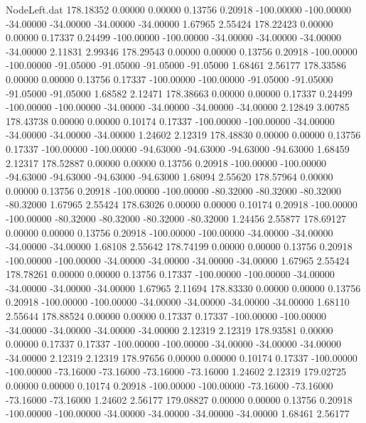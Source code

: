 \begin{filecontents}{NodeLeft.dat}
 178.18352    0.00000    0.00000     0.13756    0.20918 -100.00000 -100.00000  -34.00000  -34.00000  -34.00000  -34.00000    1.67965    2.55424
 178.22423    0.00000    0.00000     0.17337    0.24499 -100.00000 -100.00000  -34.00000  -34.00000  -34.00000  -34.00000    2.11831    2.99346
 178.29543    0.00000    0.00000     0.13756    0.20918 -100.00000 -100.00000  -91.05000  -91.05000  -91.05000  -91.05000    1.68461    2.56177
 178.33586    0.00000    0.00000     0.13756    0.17337 -100.00000 -100.00000  -91.05000  -91.05000  -91.05000  -91.05000    1.68582    2.12471
 178.38663    0.00000    0.00000     0.17337    0.24499 -100.00000 -100.00000  -34.00000  -34.00000  -34.00000  -34.00000    2.12849    3.00785
 178.43738    0.00000    0.00000     0.10174    0.17337 -100.00000 -100.00000  -34.00000  -34.00000  -34.00000  -34.00000    1.24602    2.12319
 178.48830    0.00000    0.00000     0.13756    0.17337 -100.00000 -100.00000  -94.63000  -94.63000  -94.63000  -94.63000    1.68459    2.12317
 178.52887    0.00000    0.00000     0.13756    0.20918 -100.00000 -100.00000  -94.63000  -94.63000  -94.63000  -94.63000    1.68094    2.55620
 178.57964    0.00000    0.00000     0.13756    0.20918 -100.00000 -100.00000  -80.32000  -80.32000  -80.32000  -80.32000    1.67965    2.55424
 178.63026    0.00000    0.00000     0.10174    0.20918 -100.00000 -100.00000  -80.32000  -80.32000  -80.32000  -80.32000    1.24456    2.55877
 178.69127    0.00000    0.00000     0.13756    0.20918 -100.00000 -100.00000  -34.00000  -34.00000  -34.00000  -34.00000    1.68108    2.55642
 178.74199    0.00000    0.00000     0.13756    0.20918 -100.00000 -100.00000  -34.00000  -34.00000  -34.00000  -34.00000    1.67965    2.55424
 178.78261    0.00000    0.00000     0.13756    0.17337 -100.00000 -100.00000  -34.00000  -34.00000  -34.00000  -34.00000    1.67965    2.11694
 178.83330    0.00000    0.00000     0.13756    0.20918 -100.00000 -100.00000  -34.00000  -34.00000  -34.00000  -34.00000    1.68110    2.55644
 178.88524    0.00000    0.00000     0.17337    0.17337 -100.00000 -100.00000  -34.00000  -34.00000  -34.00000  -34.00000    2.12319    2.12319
 178.93581    0.00000    0.00000     0.17337    0.17337 -100.00000 -100.00000  -34.00000  -34.00000  -34.00000  -34.00000    2.12319    2.12319
 178.97656    0.00000    0.00000     0.10174    0.17337 -100.00000 -100.00000  -73.16000  -73.16000  -73.16000  -73.16000    1.24602    2.12319
 179.02725    0.00000    0.00000     0.10174    0.20918 -100.00000 -100.00000  -73.16000  -73.16000  -73.16000  -73.16000    1.24602    2.56177
 179.08827    0.00000    0.00000     0.13756    0.20918 -100.00000 -100.00000  -34.00000  -34.00000  -34.00000  -34.00000    1.68461    2.56177

\end{filecontents}
